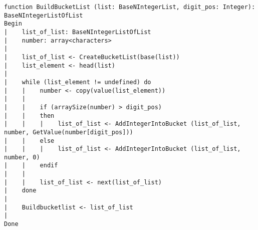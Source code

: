 \begin{lstlisting}[breaklines]
function BuildBucketList (list: BaseNIntegerList, digit_pos: Integer): BaseNIntegerListOfList
Begin
|    list_of_list: BaseNIntegerListOfList
|    number: array<characters>
|
|    list_of_list <- CreateBucketList(base(list))
|    list_element <- head(list)
|
|    while (list_element != undefined) do
|    |    number <- copy(value(list_element))
|    |
|    |    if (arraySize(number) > digit_pos)
|    |    then
|    |    |    list_of_list <- AddIntegerIntoBucket (list_of_list, number, GetValue(number[digit_pos]))
|    |    else
|    |    |    list_of_list <- AddIntegerIntoBucket (list_of_list, number, 0)
|    |    endif
|    |
|    |    list_of_list <- next(list_of_list)
|    done
|
|    Buildbucketlist <- list_of_list
|
Done
\end{lstlisting}
